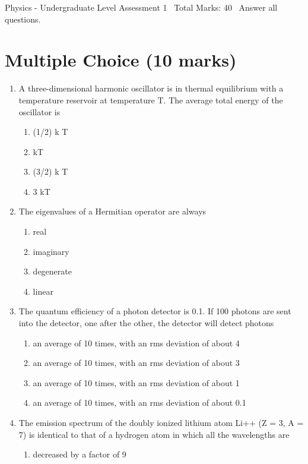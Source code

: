 \documentclass[12pt]{article}
\begin{document}
\begin{center}
Physics - Undergraduate Level Assessment 1 \
Total Marks: 40 \
Answer all questions.
\end{center}

\section*{Multiple Choice (10 marks)}
\begin{enumerate}[label=\arabic*.]
\item A three-dimensional harmonic oscillator is in thermal equilibrium with a temperature reservoir at temperature T. The average total energy of the oscillator is
\begin{enumerate}[label=(\alph*)]
    \item (1/2) k T
    \item kT
    \item (3/2) k T
    \item 3 kT
\end{enumerate}
\item The eigenvalues of a Hermitian operator are always
\begin{enumerate}[label=(\alph*)]
    \item real
    \item imaginary
    \item degenerate
    \item linear
\end{enumerate}
\item The quantum efficiency of a photon detector is 0.1. If 100 photons are sent into the detector, one after the other, the detector will detect photons
\begin{enumerate}[label=(\alph*)]
    \item an average of 10 times, with an rms deviation of about 4
    \item an average of 10 times, with an rms deviation of about 3
    \item an average of 10 times, with an rms deviation of about 1
    \item an average of 10 times, with an rms deviation of about 0.1
\end{enumerate}
\item The emission spectrum of the doubly ionized lithium atom Li++ (Z = 3, A = 7) is identical to that of a hydrogen atom in which all the wavelengths are
\begin{enumerate}[label=(\alph*)]
    \item decreased by a factor of 9

\end{enumerate}
\end{enumerate}
\end{document}

